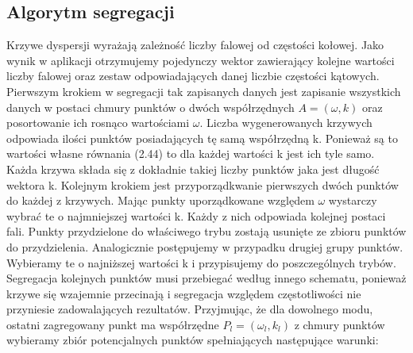 \subsection{Algorytm segregacji}
 Krzywe dyspersji wyrażają zależność liczby falowej od częstości kołowej. Jako wynik w aplikacji otrzymujemy pojedynczy wektor zawierający kolejne wartości liczby falowej oraz zestaw odpowiadających danej liczbie częstości kątowych. Pierwszym krokiem w segregacji tak zapisanych danych jest zapisanie wszystkich danych w postaci chmury punktów o dwóch współrzędnych $A=(\omega , k)$ oraz posortowanie ich rosnąco wartościami $\omega$. Liczba wygenerowanych krzywych odpowiada ilości punktów posiadających tę samą współrzędną k. Ponieważ są to wartości własne równania (2.44) to dla każdej wartości k jest ich tyle samo. Każda krzywa składa się z dokładnie takiej liczby punktów jaka jest długość wektora k. Kolejnym krokiem jest przyporządkwanie pierwszych dwóch punktów do każdej z krzywych. Mając punkty uporządkowane względem $\omega$ wystarczy wybrać te o najmniejszej wartości k. Każdy z nich odpowiada kolejnej postaci fali. Punkty przydzielone do właściwego trybu zostają usunięte ze zbioru punktów do przydzielenia. Analogicznie postępujemy w przypadku drugiej grupy punktów. Wybieramy te o najniższej wartości k i przypisujemy do poszczególnych trybów. Segregacja kolejnych punktów musi przebiegać według innego schematu, ponieważ krzywe się wzajemnie przecinają i segregacja względem częstotliwości nie przyniesie zadowalających rezultatów. Przyjmując, że dla dowolnego modu, ostatni zagregowany punkt ma współrzędne $P_l = (\omega _l,k_l)$ z chmury punktów wybieramy zbiór potencjalnych punktów spełniających następujące warunki:
